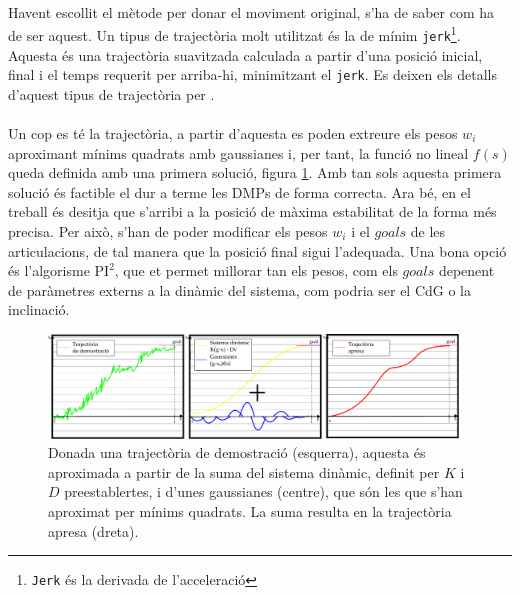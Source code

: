 \documentclass[12pt,a4paper,final,twoside]{article}
\begin{document}
\paragraph{}Havent escollit el mètode per donar el moviment original, s'ha de saber com ha de ser aquest. Un tipus de trajectòria molt utilitzat és la de mínim \texttt{jerk}\footnote{\texttt{Jerk} és la derivada de l'acceleració}. Aquesta és una trajectòria suavitzada calculada a partir d'una posició inicial, final i el temps requerit per arriba-hi, minimitzant el \texttt{jerk}. Es deixen els detalls d'aquest tipus de trajectòria per \cite{Shadmehr2004}.

\paragraph{}Un cop es té la trajectòria, a partir d'aquesta es poden extreure els pesos $w_i$ aproximant mínims quadrats amb gaussianes i, per tant, la funció no lineal $f(s)$ queda definida amb una primera solució, figura \ref{fig:LdF-trajectories}. Amb tan sols aquesta primera solució és factible el dur a terme les DMPs de forma correcta. Ara bé, en el treball és desitja que s'arribi a la posició de màxima estabilitat de la forma més precisa. Per això, s'han de poder modificar els pesos $w_i$ i el $goals$ de les articulacions, de tal manera que la posició final sigui l'adequada. Una bona opció és l'algorisme $\mathrm{PI^2}$, que et permet millorar tan els pesos, com els $goals$ depenent de paràmetres externs a la dinàmic del sistema, com podria ser el CdG o la inclinació. 
\begin{figure}[h]
\centering
\includegraphics[width=0.97\textwidth]{Imatges/Aprenentatge-per-demostracio.pdf}
\caption[DMP a partir una trajectòria de demostració]{Donada una trajectòria de demostració (esquerra), aquesta és aproximada a partir de la suma del sistema dinàmic, definit per $K$ i $D$ preestablertes, i d'unes gaussianes (centre), que són les que s'han aproximat per mínims quadrats. La suma resulta en la trajectòria apresa (dreta).}
\label{fig:LdF-trajectories}
\end{figure}

\end{document}
